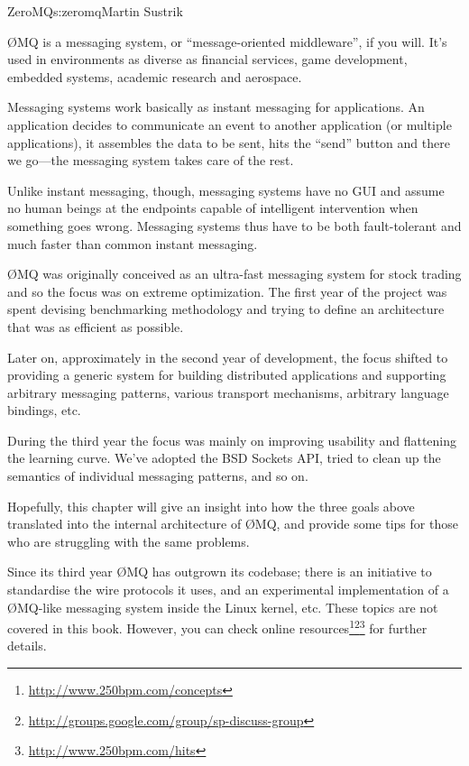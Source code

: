 \begin{aosachapter}{ZeroMQ}{s:zeromq}{Martin Sustrik}


{\O}MQ is a messaging system, or ``message-oriented middleware'', if you
will. It's used in environments as diverse as financial services, game
development, embedded systems, academic research and aerospace.

Messaging systems work basically as instant messaging for
applications. An application decides to communicate an event to
another application (or multiple applications), it assembles the data
to be sent, hits the ``send'' button and there we go---the messaging
system takes care of the rest.

Unlike instant messaging, though, messaging systems have no GUI and
assume no human beings at the endpoints capable of intelligent
intervention when something goes wrong. Messaging systems thus have to
be both fault-tolerant and much faster than common instant messaging.

{\O}MQ was originally conceived as an ultra-fast messaging system
for stock trading and so the focus was on extreme optimization. The
first year of the project was spent devising benchmarking methodology
and trying to define an architecture that was as efficient as possible.

Later on, approximately in the second year of development, the focus
shifted to providing a generic system for building distributed
applications and supporting arbitrary messaging patterns, various
transport mechanisms, arbitrary language bindings, etc.

During the third year the focus was mainly on improving usability and 
flattening the learning curve. We've adopted the BSD Sockets API, tried to
clean up the semantics of individual messaging patterns, and so on.

Hopefully, this chapter will give an insight into how the three goals
above translated into the internal architecture of {\O}MQ, and provide
some tips for those who are struggling with the same problems.

Since its third year {\O}MQ has outgrown its codebase; there is
an initiative to standardise the wire protocols it uses, and an
experimental implementation of a {\O}MQ-like messaging system inside the Linux
kernel, etc.  These topics are not covered in this book. However, you can check
online
resources\footnote{\url{http://www.250bpm.com/concepts}}\footnote{\url{http://groups.google.com/group/sp-discuss-group}}\footnote{\url{http://www.250bpm.com/hits}}
for further details.


\end{aosachapter}
